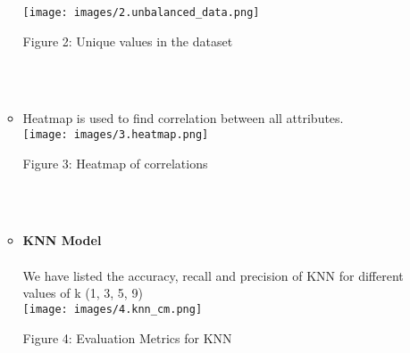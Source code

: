 \documentclass{article}
\begin{document}
\begin{enumerate}[wide, labelwidth=!, labelindent=0pt]
\begin{itemize}
            \hspace*{1cm}
            \texttt{[image: images/2.unbalanced\_data.png]}
            \begin{center}
            \caption{Figure 2: Unique values in the dataset}
            \end{center}\\\\
            
            \item Heatmap is used to find correlation between all attributes.\\
            \hspace*{-2cm}
            \texttt{[image: images/3.heatmap.png]}
            \begin{center}
            \caption{Figure 3: Heatmap of correlations}
            \end{center}\\\\
            
            \item  \textbf{KNN Model}\\\\
            We have listed the accuracy, recall and precision of KNN for different values of k (1, 3, 5, 9)\\
            \hspace{2cm}
            \texttt{[image: images/4.knn\_cm.png]}
            \begin{center}
            \caption{Figure 4: Evaluation Metrics for KNN}
            \end{center}
        \end{itemize}\\



\end{enumerate}
\end{document}
